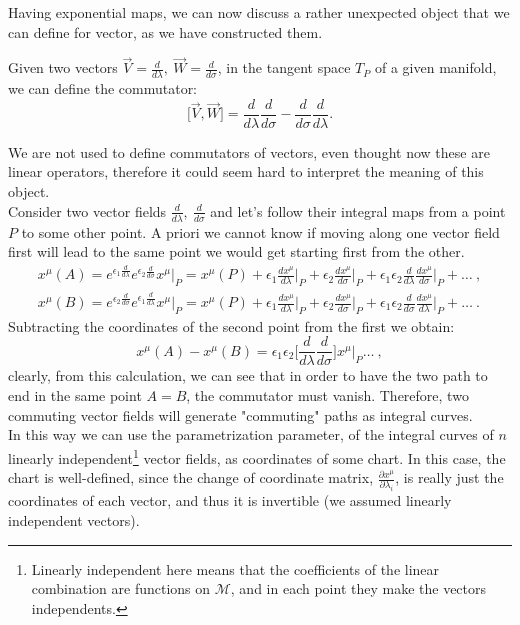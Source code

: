 Having exponential maps, we can now discuss a rather unexpected object that we can define for vector, as we have constructed them.
\begin{defin}[Commutators]
	Given two vectors $\vec V=\frac{d}{d\lambda},\ \vec W=\frac{d}{d\sigma}$, in the tangent space $T_P$ of a given manifold, we can define the commutator: $$\big[\vec V,\vec W\big]=\frac{d}{d\lambda}\frac{d}{d\sigma}-\frac{d}{d\sigma} \frac{d}{d\lambda}.$$
\end{defin}
We are not used to define commutators of vectors, even thought now these are linear operators, therefore it could seem hard to interpret the meaning of this object.\\ Consider two vector fields $\frac{d}{d\lambda},\ \frac{d}{d\sigma}$ and let's follow their integral maps from a point $P$ to some other point. A priori we cannot know if moving along one vector field first will lead to the same point we would get starting first from the other.
\begin{align*}
	x^\mu(A)=e^{\epsilon_1\frac{d}{d\lambda}}e^{\epsilon_2\frac{d}{d\sigma}}x^\mu\big|_P=x^\mu(P)+\epsilon_1\frac{dx^\mu}{d\lambda}\bigg|_P+\epsilon_2\frac{dx^\mu}{d\sigma}\bigg|_P+\epsilon_1\epsilon_2\frac{d}{d\lambda}\frac{dx^\mu}{d\sigma}\bigg|_P+\dots\ ,\\
	x^\mu(B)=e^{\epsilon_2\frac{d}{d\sigma}}e^{\epsilon_1\frac{d}{d\lambda}}x^\mu\big|_P=x^\mu(P)+\epsilon_1\frac{dx^\mu}{d\lambda}\bigg|_P+\epsilon_2\frac{dx^\mu}{d\sigma}\bigg|_P+\epsilon_1\epsilon_2\frac{d}{d\sigma}\frac{dx^\mu}{d\lambda}\bigg|_P+\dots\ .	
\end{align*}
Subtracting the coordinates of the second point from the first we obtain:
$$x^\mu(A)-x^\mu(B)=\epsilon_1\epsilon_2\bigg[\frac{d}{d\lambda}\frac{d}{d\sigma}\bigg]x^\mu\big|_P\dots\ ,$$
clearly, from this calculation, we can see that in order to have the two path to end in the same point $A=B$, the commutator must vanish. Therefore, two commuting vector fields will generate "commuting" paths as integral curves.\\ In this way we can use the parametrization parameter, of the integral curves of $n$ linearly independent\footnote{Linearly independent here means that the coefficients of the linear combination are functions on $\mathcal{M}$, and in each point they make the vectors independents.} vector fields, as coordinates of some chart. In this case, the chart is well-defined, since the change of coordinate matrix, $\frac{\partial x^\mu}{\partial \lambda_i}$, is really just the coordinates of each vector, and thus it is invertible (we assumed linearly independent vectors).\\

